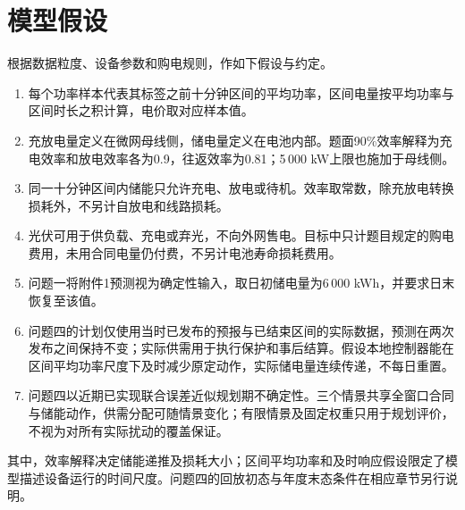 \section{模型假设}
根据数据粒度、设备参数和购电规则，作如下假设与约定。
\begin{enumerate}
  \item 每个功率样本代表其标签之前十分钟区间的平均功率，区间电量按平均功率与区间时长之积计算，电价取对应样本值。
  \item 充放电量定义在微网母线侧，储电量定义在电池内部。题面90\%效率解释为充电效率和放电效率各为0.9，往返效率为0.81；5\,000 kW上限也施加于母线侧。
  \item 同一十分钟区间内储能只允许充电、放电或待机。效率取常数，除充放电转换损耗外，不另计自放电和线路损耗。
  \item 光伏可用于供负载、充电或弃光，不向外网售电。目标中只计题目规定的购电费用，未用合同电量仍付费，不另计电池寿命损耗费用。
  \item 问题一将附件1预测视为确定性输入，取日初储电量为6\,000 kWh，并要求日末恢复至该值。
  \item 问题四的计划仅使用当时已发布的预报与已结束区间的实际数据，预测在两次发布之间保持不变；实际供需用于执行保护和事后结算。假设本地控制器能在区间平均功率尺度下及时减少原定动作，实际储电量连续传递，不每日重置。
  \item 问题四以近期已实现联合误差近似规划期不确定性。三个情景共享全窗口合同与储能动作，供需分配可随情景变化；有限情景及固定权重只用于规划评价，不视为对所有实际扰动的覆盖保证。
\end{enumerate}
其中，效率解释决定储能递推及损耗大小；区间平均功率和及时响应假设限定了模型描述设备运行的时间尺度。问题四的回放初态与年度末态条件在相应章节另行说明。

